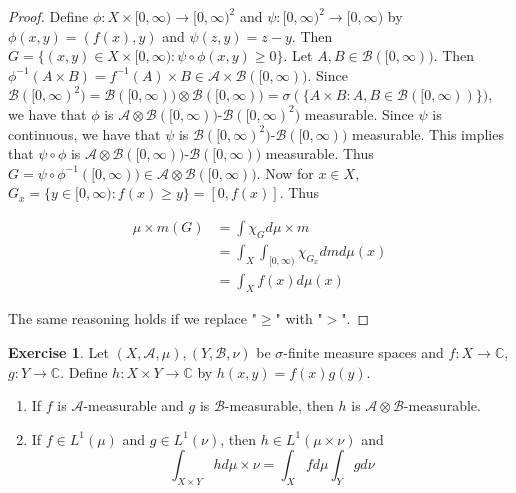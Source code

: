 \documentclass[12pt]{amsart}
\theoremstyle{definition}
\newtheorem{ex}[definition]{Exercise}
\newcommand{\sig}{\sigma}
\newcommand{\C}{\mathbb{C}}
\newcommand{\MA}{\mathcal{A}}
\newcommand{\MB}{\mathcal{B}}
\newcommand{\Rg}{[0,\infty)}
\newcommand{\lex}[1]{\label{ex:#1}}
\begin{document}
	\begin{proof}
		Define $\phi: X \times \Rg \rightarrow \Rg^2$ and $\psi: \Rg^2 \rightarrow \Rg$ by $\phi(x,y) = (f(x),y)$ and $\psi(z,y) = z-y$. Then $G = \{(x,y) \in X \times \Rg: \psi \circ \phi(x,y) \geq 0\}$. Let $A, B \in \MB(\Rg)$. Then $\phi^{-1}(A \times B) = f^{-1}(A) \times B \in \MA \times \MB(\Rg)$. Since $\MB(\Rg^2) = \MB(\Rg) \otimes \MB(\Rg) = \sig(\{A \times B: A, B \in \MB(\Rg)\})$, we have that $\phi$ is $\MA \otimes \MB(\Rg)$-$\MB(\Rg^2)$ measurable. Since $\psi$ is continuous, we have that $\psi$ is $\MB(\Rg^2)$-$\MB(\Rg)$ measurable. This implies that $\psi \circ \phi$ is $\MA \otimes \MB(\Rg)$-$\MB(\Rg)$ measurable. Thus $G = \psi \circ \phi^{-1}(\Rg) \in \MA \otimes \MB(\Rg)$. Now for $x \in X$, $G_x = \{y \in \Rg: f(x) \geq y\} = [0, f(x)]$. Thus 
		
		\begin{align*}
			\mu \times m(G) 
			&= \int \chi_G d\mu \times m\\
			&= \int_X \int_{\Rg} \chi_{G_x} dm d\mu(x)\\
			&= \int_X f(x) d\mu(x) 
		\end{align*}
		
		The same reasoning holds if we replace "$\geq$" with "$>$".
	\end{proof}
	
	\begin{ex} \lex{00000} 
		Let $(X, \MA, \mu), (Y, \MB, \nu)$ be $\sig$-finite measure spaces and $f:X \rightarrow \C$, $g:Y \rightarrow \C$. Define $h:X \times Y \rightarrow \C$ by $h(x,y) = f(x)g(y)$.
		
		\begin{enumerate}
			\item If $f$ is $\MA$-measurable and $g$ is $\MB$-measurable, then $h$ is $\MA \otimes \MB$-measurable.
			
			\item If $f \in L^1(\mu)$ and $g \in L^1(\nu)$, then $h \in L^1(\mu \times \nu)$ and $$\int_{X \times Y}hd \mu \times \nu = \int_X f d\mu \int_Y g d\nu$$
		\end{enumerate}
	\end{ex}
	
\end{document}
